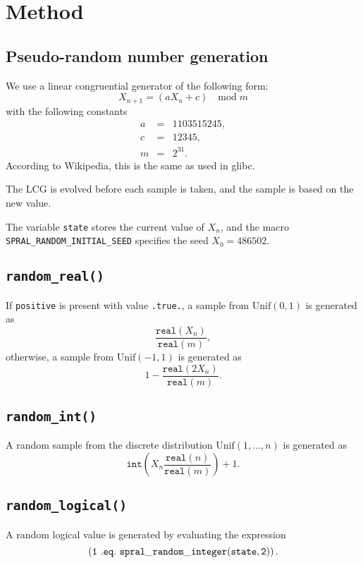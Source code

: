 \section{Method} \label{method}

\subsection{Pseudo-random number generation}
We use a linear congruential generator of the following form:
$$
   X_{n+1} = (aX_n + c)\quad \mathrm{mod}\; m
$$
with the following constants
\begin{eqnarray*}
   a &=& 1103515245, \\
   c &=& 12345, \\
   m &=& 2^{31}.
\end{eqnarray*}
According to Wikipedia, this is the same as used in glibc.

The LCG is evolved before each sample is taken, and the sample is based on the
new value.

The variable \texttt{state} stores the current value of $X_n$, and the macro
\texttt{SPRAL\_RANDOM\_INITIAL\_SEED} specifies the seed $X_0 = 486502$.

\subsection{\tt random\_real()}
If {\tt positive} is present with value {\tt .true.}, a sample from $\mathrm{Unif}(0,1)$ is generated as
$$
   \frac{\texttt{real}(X_n)}{\texttt{real}(m)},
$$
otherwise, a sample from $\mathrm{Unif}(-1,1)$ is generated as
$$
   1 - \frac{\texttt{real}(2X_n)}{\texttt{real}(m)}.
$$

\subsection{\tt random\_int()}
A random sample from the discrete distribution $\mathrm{Unif}(1, \ldots, n)$ is
generated as
$$
   \texttt{int}\left( X_n \frac{\texttt{real}(n)}{\texttt{real}(m)} \right) + 1.
$$

\subsection{\tt random\_logical()}
A random logical value is generated by evaluating the expression
$$
\tt \left(1\ .eq.\ spral\_random\_integer(state, 2)\right).
$$



